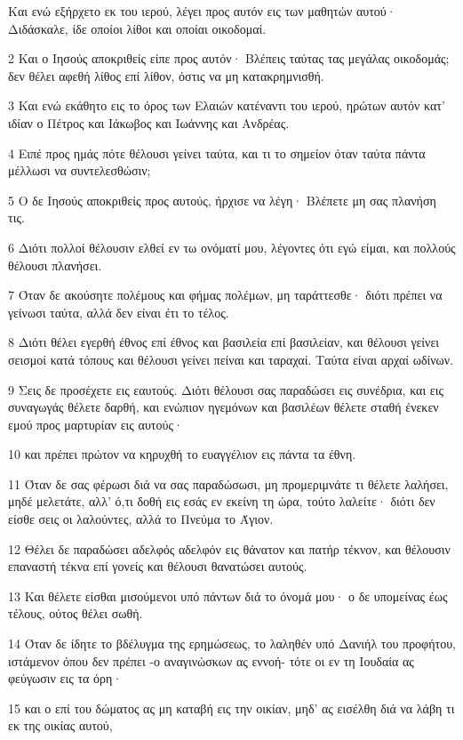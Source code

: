 \par Και ενώ εξήρχετο εκ του ιερού, λέγει προς αυτόν εις των μαθητών αυτού· Διδάσκαλε, ίδε οποίοι λίθοι και οποίαι οικοδομαί.
\par 2 Και ο Ιησούς αποκριθείς είπε προς αυτόν· Βλέπεις ταύτας τας μεγάλας οικοδομάς; δεν θέλει αφεθή λίθος επί λίθον, όστις να μη κατακρημνισθή.
\par 3 Και ενώ εκάθητο εις το όρος των Ελαιών κατέναντι του ιερού, ηρώτων αυτόν κατ' ιδίαν ο Πέτρος και Ιάκωβος και Ιωάννης και Ανδρέας.
\par 4 Ειπέ προς ημάς πότε θέλουσι γείνει ταύτα, και τι το σημείον όταν ταύτα πάντα μέλλωσι να συντελεσθώσιν;
\par 5 Ο δε Ιησούς αποκριθείς προς αυτούς, ήρχισε να λέγη· Βλέπετε μη σας πλανήση τις.
\par 6 Διότι πολλοί θέλουσιν ελθεί εν τω ονόματί μου, λέγοντες ότι εγώ είμαι, και πολλούς θέλουσι πλανήσει.
\par 7 Όταν δε ακούσητε πολέμους και φήμας πολέμων, μη ταράττεσθε· διότι πρέπει να γείνωσι ταύτα, αλλά δεν είναι έτι το τέλος.
\par 8 Διότι θέλει εγερθή έθνος επί έθνος και βασιλεία επί βασιλείαν, και θέλουσι γείνει σεισμοί κατά τόπους και θέλουσι γείνει πείναι και ταραχαί. Ταύτα είναι αρχαί ωδίνων.
\par 9 Σεις δε προσέχετε εις εαυτούς. Διότι θέλουσι σας παραδώσει εις συνέδρια, και εις συναγωγάς θέλετε δαρθή, και ενώπιον ηγεμόνων και βασιλέων θέλετε σταθή ένεκεν εμού προς μαρτυρίαν εις αυτούς·
\par 10 και πρέπει πρώτον να κηρυχθή το ευαγγέλιον εις πάντα τα έθνη.
\par 11 Όταν δε σας φέρωσι διά να σας παραδώσωσι, μη προμεριμνάτε τι θέλετε λαλήσει, μηδέ μελετάτε, αλλ' ό,τι δοθή εις εσάς εν εκείνη τη ώρα, τούτο λαλείτε· διότι δεν είσθε σεις οι λαλούντες, αλλά το Πνεύμα το Άγιον.
\par 12 Θέλει δε παραδώσει αδελφός αδελφόν εις θάνατον και πατήρ τέκνον, και θέλουσιν επαναστή τέκνα επί γονείς και θέλουσι θανατώσει αυτούς.
\par 13 Και θέλετε είσθαι μισούμενοι υπό πάντων διά το όνομά μου· ο δε υπομείνας έως τέλους, ούτος θέλει σωθή.
\par 14 Όταν δε ίδητε το βδέλυγμα της ερημώσεως, το λαληθέν υπό Δανιήλ του προφήτου, ιστάμενον όπου δεν πρέπει -ο αναγινώσκων ας εννοή- τότε οι εν τη Ιουδαία ας φεύγωσιν εις τα όρη·
\par 15 και ο επί του δώματος ας μη καταβή εις την οικίαν, μηδ' ας εισέλθη διά να λάβη τι εκ της οικίας αυτού,
